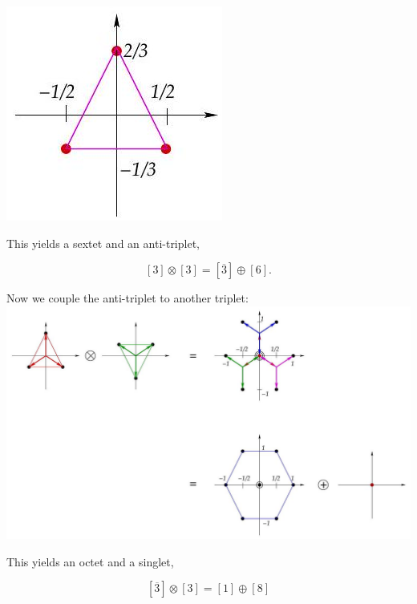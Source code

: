 \documentclass[10pt, letterpaper]{article}
\begin{document}
\includegraphics[scale=0.3, center]{2025_05_20_8618f55a41bfe980b4b2g-54}

This yields a sextet and an anti-triplet,

$$
[3] \otimes[3]=[\overline{3}] \oplus[6] .
$$

Now we couple the anti-triplet to another triplet:\\
\includegraphics[scale=0.3, center]{2025_05_20_8618f55a41bfe980b4b2g-55(2)}

This yields an octet and a singlet,

$$
[\overline{3}] \otimes[3]=[1] \oplus[8]
$$
\end{document}
